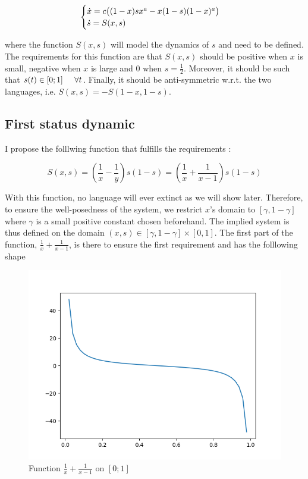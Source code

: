 \documentclass{article}
\begin{document}
\begin{equation}
\label{eq:1dtemp}
\begin{cases}
\dot{x} = c\big( (1-x)sx^a - x(1-s)(1-x)^a \big) \\
\dot{s} = S(x, s) \\
\end{cases}
\end{equation}

where the function $S(x,s)$ will model the dynamics of $s$ and need to be defined.
The requirements for this function are that $S(x,s)$ should be positive when $x$ is small, negative when $x$ is large and $0$ when $s = \frac{1}{2}$.
Moreover, it should be such that $s(t) \in [0;1] \hspace{0.5cm} \forall{t}$.
Finally, it should be anti-symmetric w.r.t. the two languages, i.e. $S(x,s) = - S(1-x, 1-s)$.

\subsection*{First status dynamic}

I propose the folllwing function that fulfills the requirements :

\begin{equation}
\label{eq:sdyn1}
S(x,s) = (\frac{1}{x}-\frac{1}{y})s(1-s) = (\frac{1}{x}+\frac{1}{x-1})s(1-s)
\end{equation}

With this function, no language will ever extinct as we will show later. Therefore, to ensure the well-posedness of the system, we restrict $x$'s domain to $[\gamma, 1-\gamma]$  where $\gamma$ is a small positive constant chosen beforehand. The implied system is thus defined on the domain $(x,s) \in [\gamma, 1-\gamma] \times [0,1]$.
The first part of the function, $\frac{1}{x}+\frac{1}{x-1}$, is there to ensure the first requirement and has the folllowing shape

\begin{figure}[H]
\centering
\includegraphics[scale=0.5]{functionofs.png}
\caption{Function $\frac{1}{x}+\frac{1}{x-1}$ on $[0;1]$}
\label{fig:functionofs}
\end{figure}
\end{document}
